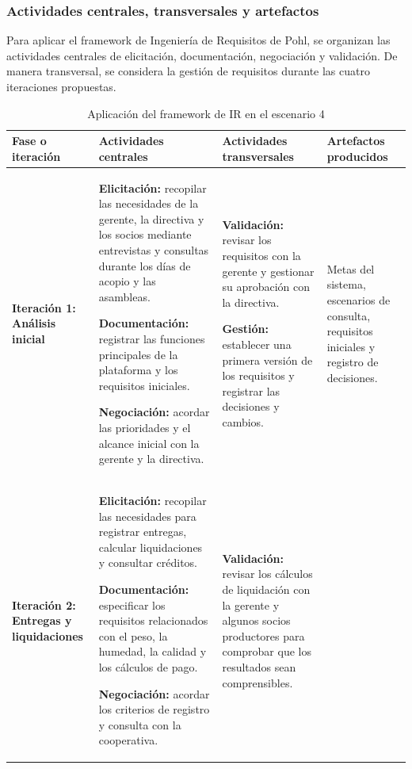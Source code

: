 \documentclass[12pt,a4paper]{article}
\renewcommand{\arraystretch}{1.3}
\begin{document}
\FloatBarrier
\subsubsection{Actividades centrales, transversales y artefactos}

Para aplicar el framework de Ingeniería de Requisitos de Pohl, se organizan las actividades centrales de elicitación, documentación, negociación y validación. De manera transversal, se considera la gestión de requisitos durante las cuatro iteraciones propuestas.

\begin{table}[H]
\centering
\caption{Aplicación del framework de IR en el escenario 4}
\label{tab:framework_escenario4}
\scriptsize
\renewcommand{\arraystretch}{1.05}
\setlength{\tabcolsep}{3pt}
\begin{tabularx}{\textwidth}{
    >{\raggedright\arraybackslash}p{2.1cm} Y Y Y
}
\toprule
\textbf{Fase o iteración} &
\textbf{Actividades centrales} &
\textbf{Actividades transversales} &
\textbf{Artefactos producidos} \\
\midrule

\textbf{Iteración 1: Análisis inicial}
&
\textbf{Elicitación:} recopilar las necesidades de la gerente, la directiva y los socios mediante entrevistas y consultas durante los días de acopio y las asambleas.

\textbf{Documentación:} registrar las funciones principales de la plataforma y los requisitos iniciales.

\textbf{Negociación:} acordar las prioridades y el alcance inicial con la gerente y la directiva.
&
\textbf{Validación:} revisar los requisitos con la gerente y gestionar su aprobación con la directiva.

\textbf{Gestión:} establecer una primera versión de los requisitos y registrar las decisiones y cambios.
&
Metas del sistema, escenarios de consulta, requisitos iniciales y registro de decisiones.
\\
\midrule

\textbf{Iteración 2: Entregas y liquidaciones}
&
\textbf{Elicitación:} recopilar las necesidades para registrar entregas, calcular liquidaciones y consultar créditos.

\textbf{Documentación:} especificar los requisitos relacionados con el peso, la humedad, la calidad y los cálculos de pago.

\textbf{Negociación:} acordar los criterios de registro y consulta con la cooperativa.
&
\textbf{Validación:} revisar los cálculos de liquidación con la gerente y algunos socios productores para comprobar que los resultados sean comprensibles.


\end{tabularx}
\end{table}
\end{document}

